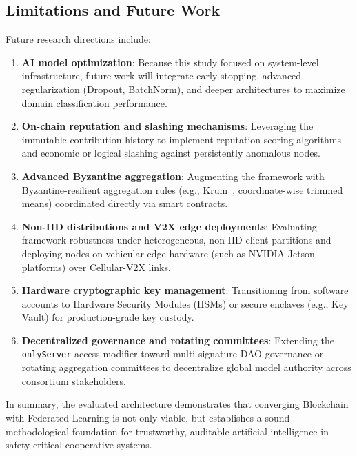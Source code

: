 \subsection{Limitations and Future Work}
Future research directions include:
\begin{enumerate}
    \item \textbf{AI model optimization}: Because this study focused on system-level infrastructure, future work will integrate early stopping, advanced regularization (Dropout, BatchNorm), and deeper architectures to maximize domain classification performance.
    \item \textbf{On-chain reputation and slashing mechanisms}: Leveraging the immutable contribution history to implement reputation-scoring algorithms and economic or logical slashing against persistently anomalous nodes.
    \item \textbf{Advanced Byzantine aggregation}: Augmenting the framework with Byzantine-resilient aggregation rules (e.g., Krum~\cite{blanchard2017byzantine}, coordinate-wise trimmed means) coordinated directly via smart contracts.
    \item \textbf{Non-IID distributions and V2X edge deployments}: Evaluating framework robustness under heterogeneous, non-IID client partitions and deploying nodes on vehicular edge hardware (such as NVIDIA Jetson platforms) over Cellular-V2X links.
    \item \textbf{Hardware cryptographic key management}: Transitioning from software accounts to Hardware Security Modules (HSMs) or secure enclaves (e.g., Key Vault) for production-grade key custody.
    \item \textbf{Decentralized governance and rotating committees}: Extending the \texttt{onlyServer} access modifier toward multi-signature DAO governance or rotating aggregation committees to decentralize global model authority across consortium stakeholders.
\end{enumerate}

In summary, the evaluated architecture demonstrates that converging Blockchain with Federated Learning is not only viable, but establishes a sound methodological foundation for trustworthy, auditable artificial intelligence in safety-critical cooperative systems.
